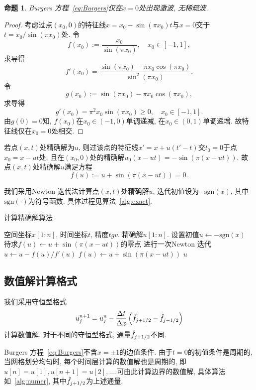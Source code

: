 \documentclass[a4paper, 12pt]{amsart}
\newcommand{\sgn}{\mathrm{sgn}}
\newcommand{\lr}[1]{\left(#1\right)}
\newcommand{\nm}[2]{\left\|\,#1\,\right\|_{#2}}
\numberwithin{equation}{section}
\newtheorem{prop}[theorem]{命题}
\begin{document}
\begin{prop}
Burgers 方程~\eqref{eq:Burgers}仅在$x=0$处出现激波, 无稀疏波. 
\end{prop}

\begin{proof}
考虑过点$(x_0,0)$的特征线$x=x_0-\sin(\pi x_0)t$与$x=0$交于$t=x_0/\sin(\pi x_0)$处. 令
\[f(x_0):=\dfrac{x_0}{\sin(\pi x_0)},\quad x_0\in[-1,1],\]
求导得
\[f'(x_0)=\dfrac{\sin(\pi x_0)-\pi x_0\cos(\pi x_0)}{\sin^2(\pi x_0)}.\]
令
\[g(x_0):=\sin(\pi x_0)-\pi x_0\cos(\pi x_0),\]
求导得
\[g'(x_0)=\pi^2x_0\sin(\pi x_0)\ge 0,\quad x_0\in[-1,1].\]
由$g(0)=0$知, $f(x_0)$在$x_0\in(-1,0)$单调递减, 在$x_0\in(0,1)$单调递增. 故特征线仅在$x_0=0$处相交.
\end{proof}

若点$(x,t)$处精确解为$u$, 则过该点的特征线$x'=x+u(t'-t)$交$t_0=0$于点$x_0=x-ut$处, 且在$(x_0,0)$处的精确解$u_0(x-ut)=-\sin(\pi(x-ut))$. 故点$(x,t)$处精确解$u$满足方程
\[f(u):=u+\sin(\pi(x-ut))=0.\]

我们采用Newton 迭代法计算点$(x,t)$处精确解$u$, 迭代初值设为$-\sgn(x)$, 其中$\sgn(\cdot)$为符号函数. 具体过程见算法~\ref{alg:exact}.
\begin{algorithm}[htbp]\caption{计算精确解算法}\label{alg:exact}\begin{algorithmic}
\Require 空间坐标$x[1:n]$, 时间坐标$t$, 精度$tgv$.
\Ensure 精确解$u[1:n]$.
	\State 设置初值$u\gets-\sgn(x)$
	\State 待求$f(u)\gets u+\sin(\pi(x-ut))$的零点
	\While{$\nm{f(u)}{\infty}>tgv$}
		\State 进行一次Newton 迭代$u\gets u-f(u)/f'(u)$
		\State $f(u)\gets u+\sin(\pi(x-ut))$
	\EndWhile
	\State\Return $u$
\EndFunction
\end{algorithmic}\end{algorithm}

\hspace*{\fill}\par\subsection{数值解计算格式}\hspace*{\fill}\par\hspace*{\fill}\par
我们采用守恒型格式
	\[u_j^{n+1}=u_j^n-\dfrac{\Delta t}{\Delta x}\lr{\Hat{f}_{j+1/2}-\Hat{f}_{j-1/2}}\]
计算数值解. 对于不同的守恒型格式, 通量$\Hat{f}_{j+1/2}$不同. 

Burgers 方程~\eqref{eq:Burgers}不含$x=\pm1$的边值条件. 由于$t=0$的初值条件是周期的, 当网格划分均匀时, 每个时间层计算的数值解也是周期的, 即$u[n]=u[1],u[n+1]=u[2],\dots.$可由此计算边界的数值解, 具体算法如~\ref{alg:numer}, 其中$\Hat{f}_{j+1/2}$为上述通量.
\end{document}
